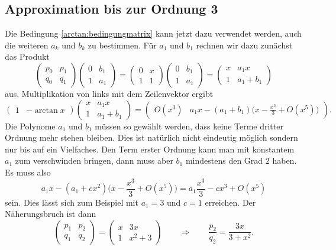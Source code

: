 \begin{refsection}
\subsection{Approximation bis zur Ordnung 3}
Die Bedingung \eqref{arctan:bedingungmatrix} kann jetzt dazu verwendet werden,
auch die weiteren $a_k$ und $b_k$ zu bestimmen.
Für $a_1$ und $b_1$ rechnen wir dazu zunächst das Produkt
\[
\begin{pmatrix}
p_0&p_1\\
q_0&q_1
\end{pmatrix}
\begin{pmatrix}
0&b_1\\
1&a_1
\end{pmatrix}
=
\begin{pmatrix}
0&x\\
1&1
\end{pmatrix}
\begin{pmatrix}
0&b_1\\
1&a_1
\end{pmatrix}
=
\begin{pmatrix}
x&a_1x\\
1&a_1+b_1
\end{pmatrix}
\]
aus. 
Multiplikation von links mit dem Zeilenvektor ergibt
\[
\begin{pmatrix}
1&-\arctan x
\end{pmatrix}
\begin{pmatrix}
x&a_1x\\
1&a_1+b_1
\end{pmatrix}
=
\begin{pmatrix}
O(x^3) & a_1x - (a_1+b_1)\biggl(\displaystyle x-\frac{x^3}3+O(x^5)\biggr)
\end{pmatrix}.
\]
Die Polynome $a_1$ und $b_1$ müssen so gewählt werden, dass keine Terme
dritter Ordnung mehr stehen bleiben.
Dies ist natürlich nicht eindeutig möglich sondern nur bis auf ein
Vielfaches.
Den Term erster Ordnung kann man mit konstantem $a_1$ zum verschwinden
bringen, dann muss aber $b_1$ mindestens den Grad $2$ haben.
Es muss also
\[
a_1x-(a_1+cx^2)\biggl(x-\frac{x^3}3+O(x^5)\biggr)
=
a_1\frac{x^3}{3}-cx^3 + O(x^5)
\]
sein.
Dies lässt sich zum Beispiel mit $a_1=3$ und $c=1$ erreichen.
Der Näherungsbruch ist dann
\[
\begin{pmatrix}
p_1&p_2\\
q_1&q_2
\end{pmatrix}
=
\begin{pmatrix}
x&3x\\
1&x^2+3
\end{pmatrix}
\qquad\Rightarrow\qquad
\frac{p_2}{q_2} = \frac{3x}{3+x^2}.
\]


\end{refsection}
